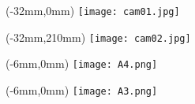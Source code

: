 \documentclass[12pt]{article}
\begin{document}
\begin{textblock*}{350mm}(-32mm,0mm)
	\texttt{[image: cam01.jpg]}
\end{textblock*}

\begin{textblock*}{350mm}(-32mm,210mm)
	\texttt{[image: cam02.jpg]}
\end{textblock*}

\begin{textblock*}{350mm}(-6mm,0mm)%
	\texttt{[image: A4.png]}
\end{textblock*}

\begin{textblock*}{350mm}(-6mm,0mm)%
	\texttt{[image: A3.png]}
\end{textblock*}

\TPMargin{3mm}
\end{document}
